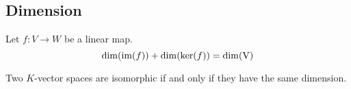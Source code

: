 \subsection{Dimension}

        \begin{theorem}
		Let $f: V \rightarrow W$ be a linear map.
	        \begin{equation}
	                \label{linalgebra:dimension_theorem}
	                \dim(\text{\upshape im}(f)) + \dim(\text{\upshape ker}(f)) = \dim(\text{\upshape V})
	        \end{equation}
        \end{theorem}

        \begin{property}
		Two $K$-vector spaces are isomorphic if and only if they have the same dimension.
	\end{property}
